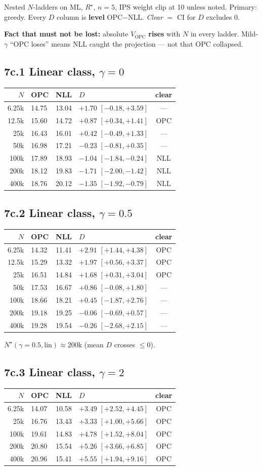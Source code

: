 \documentclass[11pt]{article}
\newcommand{\phonesub}[1]{\Needspace{6\baselineskip}\subsection*{#1}}
\newcommand{\Rstar}{R^{\star}}
\begin{document}
Nested $N$-ladders on ML, $\Rstar$, $n{=}5$,
IPS weight clip at 10 unless noted.
Primary: greedy. Every $D$ column is
\textbf{level} OPC$-$NLL.
\emph{Clear} $=$ CI for $D$ excludes 0.

\textbf{Fact that must not be lost:}
absolute $V_{\mathrm{OPC}}$ \textbf{rises}
with $N$ in every ladder. Mild-$\gamma$
``OPC loses'' means NLL caught the
projection --- not that OPC collapsed.

\phonesub{7c.1 Linear class, $\gamma{=}0$}
{\scriptsize
\begin{tabular}{@{}r lll c@{}}
\toprule
$N$ & OPC & NLL & $D$ & clear \\
\midrule
6.25k & 14.75 & 13.04 & $+1.70$ $[-0.18,+3.59]$ & --- \\
12.5k & 15.60 & 14.72 & $+0.87$ $[+0.34,+1.41]$ & OPC \\
25k & 16.43 & 16.01 & $+0.42$ $[-0.49,+1.33]$ & --- \\
50k & 16.98 & 17.21 & $-0.23$ $[-0.81,+0.35]$ & --- \\
100k & 17.89 & 18.93 & $-1.04$ $[-1.84,-0.24]$ & NLL \\
200k & 18.12 & 19.83 & $-1.71$ $[-2.00,-1.42]$ & NLL \\
400k & 18.76 & 20.12 & $-1.35$ $[-1.92,-0.79]$ & NLL \\
\bottomrule
\end{tabular}}

\phonesub{7c.2 Linear class, $\gamma{=}0.5$}
{\scriptsize
\begin{tabular}{@{}r lll c@{}}
\toprule
$N$ & OPC & NLL & $D$ & clear \\
\midrule
6.25k & 14.32 & 11.41 & $+2.91$ $[+1.44,+4.38]$ & OPC \\
12.5k & 15.29 & 13.32 & $+1.97$ $[+0.56,+3.37]$ & OPC \\
25k & 16.51 & 14.84 & $+1.68$ $[+0.31,+3.04]$ & OPC \\
50k & 17.53 & 16.67 & $+0.86$ $[-0.08,+1.80]$ & --- \\
100k & 18.66 & 18.21 & $+0.45$ $[-1.87,+2.76]$ & --- \\
200k & 19.18 & 19.25 & $-0.06$ $[-0.69,+0.57]$ & --- \\
400k & 19.28 & 19.54 & $-0.26$ $[-2.68,+2.15]$ & --- \\
\bottomrule
\end{tabular}}

$N^{\star}(\gamma{=}0.5,\mathrm{lin})\approx
200$k (mean $D$ crosses $\le 0$).

\phonesub{7c.3 Linear class, $\gamma{=}2$}
{\scriptsize
\begin{tabular}{@{}r lll c@{}}
\toprule
$N$ & OPC & NLL & $D$ & clear \\
\midrule
6.25k & 14.07 & 10.58 & $+3.49$ $[+2.52,+4.45]$ & OPC \\
25k & 16.76 & 13.43 & $+3.33$ $[+1.00,+5.66]$ & OPC \\
100k & 19.61 & 14.83 & $+4.78$ $[+1.52,+8.04]$ & OPC \\
200k & 20.80 & 15.54 & $+5.26$ $[+3.66,+6.85]$ & OPC \\
400k & 20.96 & 15.41 & $+5.55$ $[+1.94,+9.16]$ & OPC \\
\bottomrule
\end{tabular}}
\end{document}
